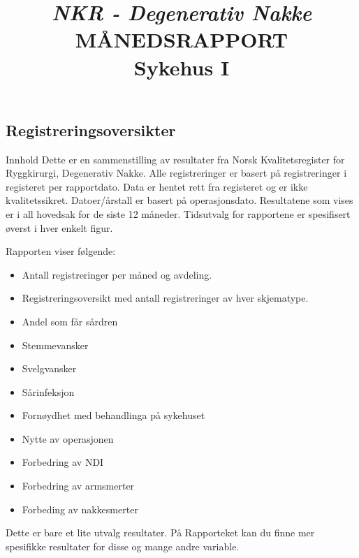 \documentclass[presentation,xcolor=pdftex,dvipsnames,table]{beamer}\usepackage[]{graphicx}\usepackage[]{color}
\title[Degenerativ Nakke \\Sykehus I]{\textit{NKR - Degenerativ Nakke} \\
MÅNEDSRAPPORT \\
Sykehus I}
\date{}
\begin{document}
\begin{tiny}

\maketitle

\section{Registreringsoversikter}

\begin{frame}[fragile] {Innhold}
Dette er en sammenstilling av resultater  fra Norsk Kvalitetsregister for Ryggkirurgi, Degenerativ Nakke.
Alle registreringer er basert på registreringer i registeret per rapportdato. Data er hentet rett fra registeret og er ikke kvalitetssikret.
Datoer/årstall er basert på operasjonsdato. Resultatene som vises er i all hovedsak for de siste 12 måneder.
Tidsutvalg for rapportene er spesifisert øverst i hver enkelt figur.

Rapporten viser følgende:
\begin{itemize}
\item Antall registreringer per måned og avdeling.
\item	Registreringsoversikt med antall registreringer av hver skjematype.
\item Andel som får sårdren
\item	Stemmevansker
\item	Svelgvansker
\item	Sårinfeksjon
\item	Fornøydhet med behandlinga på sykehuset
\item	Nytte av operasjonen
\item Forbedring av NDI
\item Forbedring av armsmerter
\item Forbeding av nakkesmerter
\end{itemize}

Dette er bare et lite utvalg resultater. På Rapporteket kan du finne mer spesifikke resultater for disse og mange andre variable.

\end{frame}


\begin{frame}[fragile]


\end{frame}
\end{tiny}
\end{document}
